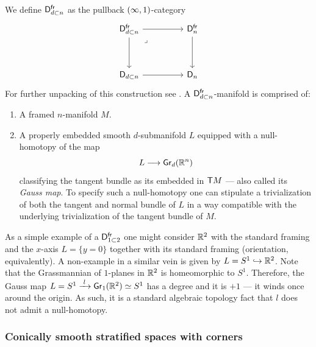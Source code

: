 \begin{example}
    We define $\mathsf D_{d\subset n}^{\operatorname{\sf fr}}$ as the pullback $(\operatorname{\infty},1)$-category 
    \begin{equation}
        \begin{tikzcd}[ampersand replacement=\&]
            {\sD_{d\subset n}^{\fr}} \&\& {\sD_{ n}^{\fr}} \\
            \\
            {\sD_{d\subset n}} \&\& {\sD_{n}}
            \arrow[from=1-1, to=1-3]
            \arrow[from=1-1, to=3-1]
            \arrow["\lrcorner"{anchor=center, pos=0.125}, draw=none, from=1-1, to=3-3]
            \arrow[from=1-3, to=3-3]
            \arrow[from=3-1, to=3-3]
        \end{tikzcd}
    \end{equation}
    For further unpacking of this construction see \cite[Example~5.2.12]{AFT1}. A $\mathsf D_{d\subset n}^{\operatorname{\sf fr}}$-manifold is comprised of:
    \begin{enumerate}
        \item A framed $n$-manifold $M$.
        \item A properly embedded smooth $d$-submanifold $L$ equipped with a null-homotopy of the map
        \begin{equation}
            L \longrightarrow \mathsf{Gr}_{d}(\mathbb R^n)
        \end{equation}
        classifying the tangent bundle as its embedded in $\mathsf T M$ — also called its \emph{Gauss map}. To specify such a null-homotopy one can stipulate a trivialization of both the tangent and normal bundle of $L$ in a way compatible with the underlying trivialization of the tangent bundle of $M$. 
    \end{enumerate}

    As a simple example of a $\mathsf D_{1\subset 2}^{\operatorname{\sf fr}}$ one might consider $\mathbb R^{2}$ with the standard framing and the $x$-axis $L = \{y = 0\}$ together with its standard framing (orientation, equivalently). A non-example in a similar vein is given by $L = S^1 \hookrightarrow \mathbb R^2$. Note that the Grassmannian of $1$-planes in $\mathbb R^{2}$ is homeomorphic to $S^1$. Therefore, the Gauss map $L = S^1 \xrightarrow{\,\,l\,\,} \mathsf{Gr}_{1}(\mathbb R^2)\simeq S^1$ has a degree and it is $+1$ — it winds once around the origin. As such, it is a standard algebraic topology fact that $l$ does not admit a null-homotopy.  
\end{example}



\subsubsection{Conically smooth stratified spaces with corners}

